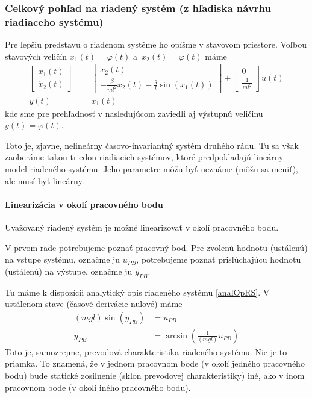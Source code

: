 \documentclass[a4paper, 10pt, ]{article}
\begin{document}
\subsubsection{Celkový pohľad na riadený systém (z hľadiska návrhu riadiaceho systému)}



Pre lepšiu predstavu o riadenom systéme ho opíšme v stavovom priestore. Voľbou stavových veličín $x_1(t) = \varphi(t)$ a~$x_2(t) = \dot\varphi(t)$ máme
\begin{subequations} \label{stavopnonlinkyv}
	\begin{align}
		\begin{bmatrix}
			\dot{x}_1(t) \\ \dot{x}_2(t)
		\end{bmatrix}
		&=
		\begin{bmatrix}
			x_2(t) \\ - \frac{\beta}{ml^2} x_2(t) - \frac{g}{l} \sin\left(x_1(t)\right)
		\end{bmatrix}
		+
		\begin{bmatrix}
			0 \\ \frac{1}{ml^2}
		\end{bmatrix}
		u(t) \\
		y(t) &= x_1(t)
	\end{align}
\end{subequations}
kde sme pre prehľadnosť v nasledujúcom zaviedli aj výstupnú veličinu $y(t) = \varphi(t)$.


Toto je, zjavne, nelineárny časovo-invariantný systém druhého rádu. Tu sa však zaoberáme takou triedou riadiacich systémov, ktoré predpokladajú lineárny model riadeného systému. Jeho parametre môžu byť neznáme (môžu sa meniť), ale musí byť lineárny.

\paragraph{Linearizácia v okolí pracovného bodu}

Uvažovaný riadený systém je možné linearizovať v okolí pracovného bodu.

V prvom rade potrebujeme poznať pracovný bod. Pre zvolenú hodnotu (ustálenú) na vstupe systému, označme ju $u_{PB}$, potrebujeme poznať prislúchajúcu hodnotu (ustálenú) na výstupe, označme ju $y_{PB}$.

Tu máme k dispozícii analytický opis riadeného systému \eqref{analOpRS}. V ustálenom stave (časové derivácie nulové) máme
\begin{subequations}
    \begin{align}
        \left(m g l\right)\sin\left(y_{PB}\right) &= u_{PB} \\
         y_{PB} &= \arcsin \left( \frac{1}{ \left(m g l\right)} u_{PB} \right)
    \end{align}
\end{subequations}
Toto je, samozrejme, prevodová charakteristika riadeného systému. Nie je to priamka. To znamená, že v jednom pracovnom bode (v okolí jedného pracovného bodu) bude statické zosilnenie (sklon prevodovej charakteristiky) iné, ako v inom pracovnom bode (v okolí iného pracovného bodu).
\end{document}
